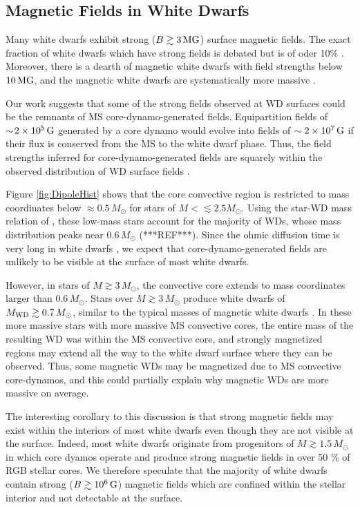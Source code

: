 \subsection{Magnetic Fields in White Dwarfs}

Many white dwarfs exhibit strong ($B \gtrsim 3 \, {\rm MG}$) surface magnetic fields. The exact fraction of white dwarfs which have strong fields is debated but is of oder 10\% \citep{Hollands_2015}. Moreover, there is a dearth of magnetic white dwarfs with field strengths below $10 \, {\rm MG}$, and the magnetic white dwarfs are systematically more massive \citep{Ferrario_2015B}.

Our work suggests that some of the strong fields observed at WD surfaces could be the remnants of MS core-dynamo-generated fields. Equipartition fields of $\sim \! 2 \times 10^5 \, {\rm G}$ generated by a core dynamo would evolve into fields of $\sim 2 \times 10^7 \, {\rm G}$ if their flux is conserved from the MS to the white dwarf phase. Thus, the field strengths inferred for core-dynamo-generated fields are squarely within the observed distribution of WD surface fields \citep{Ferrario_2015B}.

Figure \ref{fig:DipoleHist} shows that the core convective region is restricted to mass coordinates below $\approx 0.5 \, M_\odot$ for stars of $M < \lesssim 2.5 M_\odot$. Using the star-WD mass relation of \cite{Renedo_2010}, these low-mass stars account for the majority of WDs, whose mass distribution peaks near $0.6 \, M_\odot$ (***REF***). Since the ohmic diffusion time is very long in white dwarfs \citep{Ferrario_2015B}, we expect that core-dynamo-generated fields are unlikely to be visible at the surface of most white dwarfs. 

However, in stars of $M \gtrsim 3 \, M_\odot$, the convective core extends to mass coordinates larger than $0.6 \, M_\odot$. Stars over $M \gtrsim 3 \, M_\odot$ produce white dwarfs of $M_{\rm WD} \gtrsim 0.7 \, M_\odot$, similar to the typical masses of magnetic white dwarfs \citep{Ferrario_2015B}. In these more massive stars with more massive MS convective cores, the entire mass of the resulting WD was within the MS convective core, and strongly magnetized regions may extend all the way to the white dwarf surface where they can be observed. Thus, some magnetic WDs may be magnetized due to MS convective core-dynamos, and this could partially explain why magnetic WDs are more massive on average.

The interesting corollary to this discussion is that strong magnetic fields may exist within the interiors of most white dwarfs even though they are not visible at the surface. Indeed, most white dwarfs originate from progenitors of $M \gtrsim 1.5 \, M_\odot$ in which core dyamos operate and produce strong magnetic fields in over 50 \% of RGB stellar cores. We therefore speculate that the majority of white dwarfs contain strong ($B \gtrsim 10^6 \, {\rm G}$) magnetic fields which are confined within the stellar interior and not detectable at the surface.





\cite{Ferrario_2015A}
  
  
  